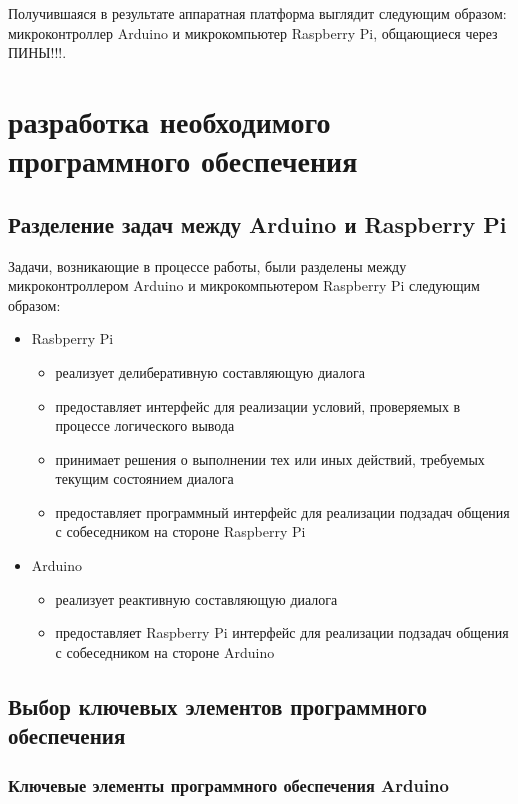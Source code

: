 Получившаяся в результате аппаратная платформа выглядит следующим образом: микроконтроллер Arduino и микрокомпьютер Raspberry Pi, общающиеся через ПИНЫ!!!.


\section{разработка необходимого программного обеспечения}
\subsection{Разделение задач между Arduino и Raspberry Pi}
Задачи, возникающие в процессе работы, были разделены между микроконтроллером Arduino и микрокомпьютером Raspberry Pi следующим образом: 
\begin{itemize}
    \item Rasbperry Pi \begin{itemize}
        \item реализует делиберативную составляющую диалога
        \item предоставляет интерфейс для реализации условий, проверяемых в процессе логического вывода
        \item принимает решения о выполнении тех или иных действий, требуемых текущим состоянием диалога
        \item предоставляет программный интерфейс для реализации подзадач общения с собеседником на стороне Raspberry Pi
    \end{itemize}
    
    \item Arduino \begin{itemize}
        \item реализует реактивную составляющую диалога
        \item предоставляет Raspberry Pi интерфейс для реализации подзадач общения с собеседником на стороне Arduino
    \end{itemize}
\end{itemize}

\subsection{Выбор ключевых элементов программного обеспечения}
\subsubsection{Ключевые элементы программного обеспечения Arduino}

